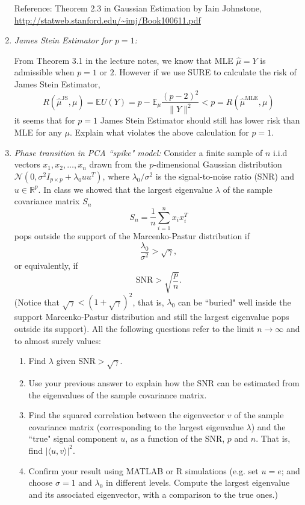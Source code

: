 \documentclass[11pt]{article}
\def\E{{\mathbb E}}
\begin{document}
\begin{enumerate}
Reference: Theorem 2.3 in Gaussian Estimation by Iain Johnstone,\\
\url{http://statweb.stanford.edu/~imj/Book100611.pdf}

\item {\em James Stein Estimator for $p=1$:} 

From Theorem 3.1 in the lecture notes, we know that MLE $\hat{\mu} = Y$ is admissible when $p=1 \text{ or } 2$. However if we use SURE to calculate the risk of James Stein Estimator,
\[
	R(\hat{\mu}^{\text{JS}},\mu) = \E U(Y) 
	= p - \E_\mu \frac{(p-2)^2}{\lVert Y \rVert^2}
	< p = R(\hat{\mu}^{\text{MLE}},\mu)
\]
it seems that for $p=1$ James Stein Estimator should still has lower risk than MLE for any $\mu$.
 Explain what violates the above calculation for $p=1$.


\item {\em Phase transition in PCA ``spike" model:} Consider a finite sample of $n$ i.i.d vectors $x_1,x_2,\ldots,x_n$ drawn from the $p$-dimensional Gaussian distribution $\mathcal{N}(0,\sigma^2 I_{p\times p} + \lambda_0 uu^T)$, where $\lambda_0/\sigma^2$ is the signal-to-noise ratio (SNR) and $u \in \mathbb{R}^p$. In class we showed that the largest eigenvalue $\lambda$ of the sample covariance matrix $S_n$
    $$S_n = \frac{1}{n} \sum_{i=1}^n x_i x_i^T$$
    pops outside the support of the Marcenko-Pastur distribution if $$\frac{\lambda_0}{\sigma^2} > \sqrt{\gamma},$$ or equivalently, if $$\text{SNR} > \sqrt{\frac{p}{n}}.$$ (Notice that $\sqrt{\gamma} < (1+\sqrt{\gamma})^2$, that is, $\lambda_0$ can be ``buried" well inside the support Marcenko-Pastur distribution and still the largest eigenvalue pops outside its support). All the following questions refer to the limit $n\to \infty$ and to almost surely values:

\begin{enumerate}
\item Find $\lambda$ given $\text{SNR} > \sqrt{\gamma}$.
\item Use your previous answer to explain how the SNR can be estimated from the eigenvalues of the sample covariance matrix.
\item Find the squared correlation between the eigenvector $v$ of the sample covariance matrix (corresponding to the largest eigenvalue $\lambda$) and the ``true" signal component $u$, as a function of the SNR, $p$ and $n$. That is, find $|\langle u,v \rangle|^2$. 
\item Confirm your result using MATLAB or R simulations (e.g. set $u = e$; and choose $\sigma=1$ and $\lambda_0$ in different levels. Compute the largest eigenvalue and its associated eigenvector, with a comparison to the true ones.)
\end{enumerate}


\end{enumerate}
\end{document}
